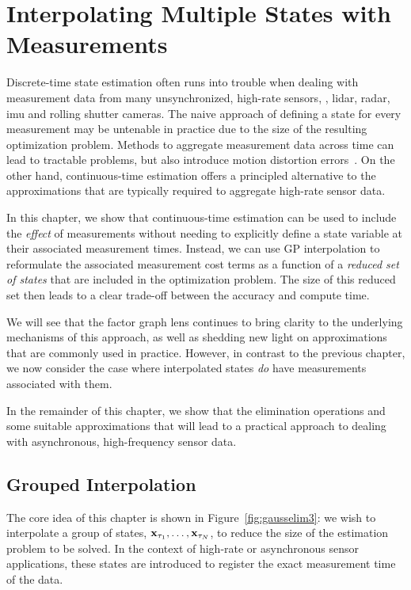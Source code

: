 
\chapter{Interpolating Multiple States with Measurements}\label{app:interp-during-solve}
Discrete-time state estimation often runs into trouble when dealing with measurement data from many unsynchronized, high-rate sensors, \eg, \ac{lidar}, \ac{radar}, \ac{imu} and rolling shutter cameras. The naive approach of defining a state for every measurement may be untenable in practice due to the size of the resulting optimization problem. Methods to aggregate measurement data across time can lead to tractable problems, but also introduce motion distortion errors~\citep{talbot_tro25}. 
On the other hand, continuous-time estimation offers a principled alternative to the approximations that are typically required to aggregate high-rate sensor data. 

In this chapter, we show that continuous-time estimation can be used to include the \emph{effect} of measurements without needing to explicitly define a state variable at their associated measurement times. Instead, we can use \ac{GP} interpolation to reformulate the associated measurement cost terms as a function of a \emph{reduced set of states} that are included in the optimization problem. The size of this reduced set then leads to a clear trade-off between the accuracy and compute time. 

We will see that the factor graph lens continues to bring clarity to the underlying mechanisms of this approach, as well as shedding new light on approximations that are commonly used in practice. However, in contrast to the previous chapter, we now consider the case where interpolated states \emph{do} have measurements associated with them.

In the remainder of this chapter, we show that the elimination operations and some suitable approximations that will lead to a practical approach to dealing with asynchronous, high-frequency sensor data.

\section{Grouped Interpolation}

The core idea of this chapter is shown in Figure~\ref{fig:gausselim3}: we wish to interpolate a group of states, $\mathbf{x}_{\tau_1}, \ldots, \mathbf{x}_{\tau_N}$, to reduce the size of the estimation problem to be solved. In the context of high-rate or asynchronous sensor applications, these states are introduced to register the exact measurement time of the data.

